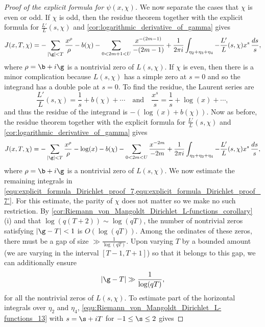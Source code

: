 \begin{proof}[Proof of the explicit formula for $\psi(x,\chi)$]
        We now separate the cases that $\chi$ is even or odd. If $\chi$ is odd, then the residue theorem together with the explicit formula for $\frac{L'}{L}(s,\chi)$ and \cref{cor:logarithmic_derivative_of_gamma} gives
        \begin{equation}\label{equ:explicit_formula_Dirichlet_proof_7}
          J(x,T,\chi) = -\sum_{|\g| < T}\frac{x^{\rho}}{\rho}-b(\chi)-\sum_{0 < 2m+1 < U}\frac{x^{-(2m-1)}}{-(2m-1)}+\frac{1}{2\pi i}\int_{\eta_{2}+\eta_{3}+\eta_{4}}-\frac{L'}{L}(s,\chi)x^{s}\,\frac{ds}{s},
        \end{equation}
        where $\rho = \b+i\g$ is a nontrivial zero of $L(s,\chi)$. If $\chi$ is even, then there is a minor complication because $L(s,\chi)$ has a simple zero at $s = 0$ and so the integrand has a double pole at $s = 0$. To find the residue, the Laurent series are
        \[
          \frac{L'}{L}(s,\chi) = \frac{1}{s}+b(\chi)+\cdots \quad \text{and} \quad \frac{x^{s}}{s} = \frac{1}{s}+\log(x)+\cdots,
        \]
        and thus the residue of the integrand is $-(\log(x)+b(\chi))$. Now as before, the residue theorem together with the explicit formula for $\frac{L'}{L}(s,\chi)$ and \cref{cor:logarithmic_derivative_of_gamma} gives
        \begin{equation}\label{equ:explicit_formula_Dirichlet_proof_7'}
          J(x,T,\chi) = -\sum_{|\g| < T}\frac{x^{\rho}}{\rho}-\log(x)-b(\chi)-\sum_{0 < 2m < U}\frac{x^{-2m}}{-2m}+\frac{1}{2\pi i}\int_{\eta_{2}+\eta_{3}+\eta_{4}}-\frac{L'}{L}(s,\chi)x^{s}\,\frac{ds}{s},
        \end{equation}
        where $\rho = \b+i\g$ is a nontrivial zero of $L(s,\chi)$. We now estimate the remaining integrals in \cref{equ:explicit_formula_Dirichlet_proof_7,equ:explicit_formula_Dirichlet_proof_7'}. For this estimate, the parity of $\chi$ does not matter so we make no such restriction. By \cref{cor:Riemann_von_Mangoldt_Dirichlet_L-functions_corollary} (i) and that $\log(q(T+2)) \sim \log(qT)$, the number of nontrivial zeros satisfying $|\g-T| < 1$ is $O(\log(qT))$. Among the ordinates of these zeros, there must be a gap of size $\gg \frac{1}{\log(qT)}$. Upon varying $T$ by a bounded amount (we are varying in the interval $[T-1,T+1]$) so that it belongs to this gap, we can additionally ensure
        \[
          |\g-T| \gg \frac{1}{\log(qT)},
        \]
        for all the nontrivial zeros of $L(s,\chi)$. To estimate part of the horizontal integrals over $\eta_{2}$ and $\eta_{4}$, \cref{equ:Riemann_von_Mangoldt_Dirichlet_L-functions_13} with $s = \s+iT$ for $-1 \le \s \le 2$ gives

\end{proof}
